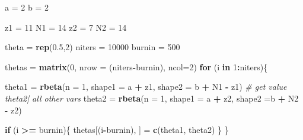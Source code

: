 \documentclass[]{book}
\newenvironment{Shaded}{\begin{snugshade}}{\end{snugshade}}
\newcommand{\KeywordTok}[1]{\textcolor[rgb]{0.13,0.29,0.53}{\textbf{#1}}}
\newcommand{\DataTypeTok}[1]{\textcolor[rgb]{0.13,0.29,0.53}{#1}}
\newcommand{\DecValTok}[1]{\textcolor[rgb]{0.00,0.00,0.81}{#1}}
\newcommand{\FloatTok}[1]{\textcolor[rgb]{0.00,0.00,0.81}{#1}}
\newcommand{\StringTok}[1]{\textcolor[rgb]{0.31,0.60,0.02}{#1}}
\newcommand{\CommentTok}[1]{\textcolor[rgb]{0.56,0.35,0.01}{\textit{#1}}}
\newcommand{\ControlFlowTok}[1]{\textcolor[rgb]{0.13,0.29,0.53}{\textbf{#1}}}
\newcommand{\OperatorTok}[1]{\textcolor[rgb]{0.81,0.36,0.00}{\textbf{#1}}}
\newcommand{\NormalTok}[1]{#1}
\theoremstyle{definition}
\theoremstyle{definition}
\theoremstyle{definition}
\theoremstyle{remark}
\begin{document}
\begin{Shaded}
\begin{Highlighting}[]
\NormalTok{a =}\StringTok{ }\DecValTok{2}
\NormalTok{b =}\StringTok{ }\DecValTok{2}

\NormalTok{z1 =}\StringTok{ }\DecValTok{11}
\NormalTok{N1 =}\StringTok{ }\DecValTok{14}
\NormalTok{z2 =}\StringTok{ }\DecValTok{7}
\NormalTok{N2 =}\StringTok{ }\DecValTok{14}


\NormalTok{theta =}\StringTok{ }\KeywordTok{rep}\NormalTok{(}\FloatTok{0.5}\NormalTok{,}\DecValTok{2}\NormalTok{)}
\NormalTok{niters =}\StringTok{ }\DecValTok{10000}
\NormalTok{burnin =}\StringTok{ }\DecValTok{500}

\NormalTok{thetas =}\StringTok{ }\KeywordTok{matrix}\NormalTok{(}\DecValTok{0}\NormalTok{, }\DataTypeTok{nrow =}\NormalTok{ (niters}\OperatorTok{-}\NormalTok{burnin), }\DataTypeTok{ncol=}\DecValTok{2}\NormalTok{)}
\ControlFlowTok{for}\NormalTok{ (i }\ControlFlowTok{in} \DecValTok{1}\OperatorTok{:}\NormalTok{niters)\{}

\NormalTok{  theta1 =}\StringTok{ }\KeywordTok{rbeta}\NormalTok{(}\DataTypeTok{n =} \DecValTok{1}\NormalTok{, }\DataTypeTok{shape1 =}\NormalTok{ a }\OperatorTok{+}\StringTok{ }\NormalTok{z1, }\DataTypeTok{shape2 =}\NormalTok{ b }\OperatorTok{+}\StringTok{ }\NormalTok{N1 }\OperatorTok{-}\StringTok{ }\NormalTok{z1)}
  \CommentTok{# get value theta2| all other vars}
\NormalTok{  theta2 =}\StringTok{ }\KeywordTok{rbeta}\NormalTok{(}\DataTypeTok{n =} \DecValTok{1}\NormalTok{, }\DataTypeTok{shape1 =}\NormalTok{ a }\OperatorTok{+}\StringTok{ }\NormalTok{z2, }\DataTypeTok{shape2 =}\NormalTok{b }\OperatorTok{+}\StringTok{ }\NormalTok{N2 }\OperatorTok{-}\StringTok{ }\NormalTok{z2)}
  
  \ControlFlowTok{if}\NormalTok{ (i }\OperatorTok{>=}\StringTok{ }\NormalTok{burnin)\{}
\NormalTok{    thetas[(i}\OperatorTok{-}\NormalTok{burnin), ] =}\StringTok{ }\KeywordTok{c}\NormalTok{(theta1, theta2)}
\NormalTok{  \}}
\NormalTok{\}}



\end{Highlighting}
\end{Shaded}
\end{document}
